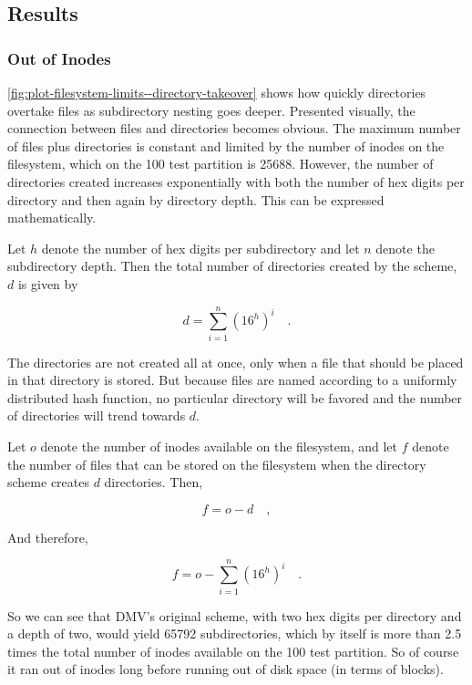\cleardoublepage
\subsection{Results}
\label{object-dir-layout-results}

\subsubsection{Out of Inodes}

\autoref{fig:plot-filesystem-limits--directory-takeover} shows how quickly
directories overtake files as subdirectory nesting goes deeper. Presented
visually, the connection between files and directories becomes obvious. The
maximum number of files plus directories is constant and limited by the number
of \glspl{inode} on the filesystem, which on the \SI{100}{\mib} test partition
is \num{25688}. However, the number of directories created increases
exponentially with both the number of hex digits per directory and then again by
directory depth. This can be expressed mathematically.

Let $h$ denote the number of hex digits per subdirectory and let $n$ denote the
subdirectory depth. Then the total number of directories created by the scheme,
$d$ is given by

\begin{equation}
    d = \sum_{i=1}^n \left( 16^h \right)^i \quad.
\end{equation}

The directories are not created all at once, only when a file that should be
placed in that directory is stored. But because files are named according to a
uniformly distributed hash function, no particular directory will be favored and
the number of directories will trend towards $d$.

Let $o$ denote the number of \glspl{inode} available on the filesystem, and let
$f$ denote the number of files that can be stored on the filesystem when the
directory scheme creates $d$ directories. Then,

\begin{equation}
    f = o-d \quad,
\end{equation}

And therefore,

\begin{equation}
    f = o - \sum_{i=1}^n \left( 16^h \right)^i \quad.
\end{equation}

So we can see that \gls{DMV}'s original scheme, with two hex digits per
directory and a depth of two, would yield \num{65792} subdirectories, which by
itself is more than \num{2.5} times the total number of \glspl{inode} available
on the \SI{100}{\mib} test partition. So of course it ran out of \glspl{inode}
long before running out of disk space (in terms of blocks).


